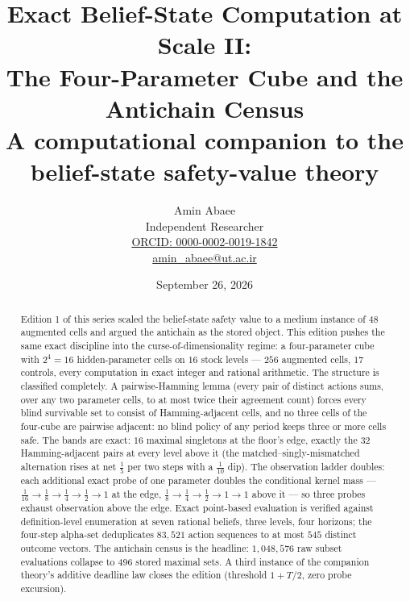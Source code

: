 \documentclass[10pt,twocolumn]{article}
\theoremstyle{plain}
\theoremstyle{definition}
\theoremstyle{remark}
\begin{document}
\title{Exact Belief-State Computation at Scale II:\\
The Four-Parameter Cube and the Antichain Census\\[0.2em]
{\large\rmfamily A computational companion to the belief-state
safety-value theory}}
\author{Amin Abaee\\[0.35em]
{\small Independent Researcher}\\[0.55em]
{\small\href{https://orcid.org/0000-0002-0019-1842}{ORCID: 0000-0002-0019-1842}}\\[0.3em]
{\small\href{mailto:amin\_abaee@ut.ac.ir}{amin\_abaee@ut.ac.ir}}}
\date{September 26, 2026}
\maketitle

\begin{abstract}
Edition 1 of this series scaled the belief-state safety value to a
medium instance of \(48\) augmented cells and argued the antichain as
the stored object. This edition pushes the same exact discipline into
the curse-of-dimensionality regime: a four-parameter cube with
\(2^{4} = 16\) hidden-parameter cells on \(16\) stock levels ---
\(256\) augmented cells, \(17\) controls, every computation in exact
integer and rational arithmetic. The structure is classified
completely. A pairwise-Hamming lemma (every pair of distinct actions
sums, over any two parameter cells, to at most twice their agreement
count) forces every blind survivable set to consist of
Hamming-adjacent cells, and no three cells of the four-cube are
pairwise adjacent: no blind policy of any period keeps three or more
cells safe. The bands are exact: \(16\) maximal singletons at the
floor's edge, exactly the \(32\) Hamming-adjacent pairs at every level
above it (the matched--singly-mismatched alternation rises at net
\(\tfrac15\) per two steps with a \(\tfrac1{10}\) dip). The
observation ladder doubles: each additional exact probe of one
parameter doubles the conditional kernel mass ---
\(\tfrac1{16} \to \tfrac18 \to \tfrac14 \to \tfrac12 \to 1\) at the
edge, \(\tfrac18 \to \tfrac14 \to \tfrac12 \to 1 \to 1\) above it ---
so three probes exhaust observation above the edge. Exact point-based
evaluation is verified against definition-level enumeration at seven
rational beliefs, three levels, four horizons; the four-step alpha-set
deduplicates \(83{,}521\) action sequences to at most \(545\) distinct
outcome vectors. The antichain census is the headline:
\(1{,}048{,}576\) raw subset evaluations collapse to \(496\) stored
maximal sets. A third instance of the companion theory's additive
deadline law closes the edition (threshold \(1 + T/2\), zero probe
excursion).
\end{abstract}
\end{document}
